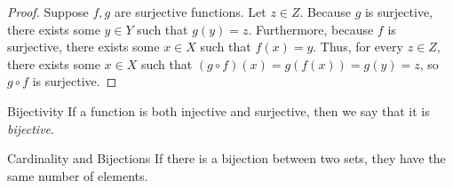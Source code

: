 \documentclass[class=article, crop=false]{standalone}
\begin{document}
  \begin{proof}
    Suppose $f, g$ are surjective functions. Let $z\in Z$. Because $g$ is surjective, there exists some $y\in Y$ such that $g(y) = z$. Furthermore, because $f$ is surjective, there exists some $x\in X$ such that $f(x) = y$. Thus, for every $z\in Z$, there exists some $x\in X$ such that $(g\circ f)(x) = g(f(x)) = g(y) = z$, so $g\circ f$ is surjective.
  \end{proof}
  \begin{definition}{Bijectivity}
    If a function is both injective and surjective, then we say that it is \emph{bijective}.
  \end{definition}
  \begin{note}{Cardinality and Bijections}
    If there is a bijection between two sets, they have the same number of elements.
  \end{note}
\end{document}
